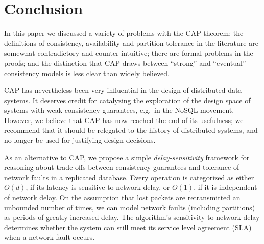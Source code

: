 \documentclass[a4paper,twocolumn,10pt]{article}
\begin{document}


\section{Conclusion}

In this paper we discussed a variety of problems with the CAP theorem: the definitions of
consistency, availability and partition tolerance in the literature are somewhat contradictory and
counter-intuitive; there are formal problems in the proofs; and the distinction that CAP draws
between ``strong'' and ``eventual'' consistency models is less clear than widely believed.

CAP has nevertheless been very influential in the design of distributed data systems. It deserves
credit for catalyzing the exploration of the design space of systems with weak consistency
guarantees, e.g.\ in the NoSQL movement. However, we believe that CAP has now reached the end of its
usefulness; we recommend that it should be relegated to the history of distributed systems, and no
longer be used for justifying design decisions.

As an alternative to CAP, we propose a simple \emph{delay-sensitivity} framework for reasoning about
trade-offs between consistency guarantees and tolerance of network faults in a replicated database.
Every operation is categorized as either $O(d)$, if its latency is sensitive to network delay, or
$O(1)$, if it is independent of network delay. On the assumption that lost packets are retransmitted
an unbounded number of times, we can model network faults (including partitions) as periods of
greatly increased delay. The algorithm's sensitivity to network delay determines whether the system
can still meet its service level agreement (SLA) when a network fault occurs.
\end{document}
